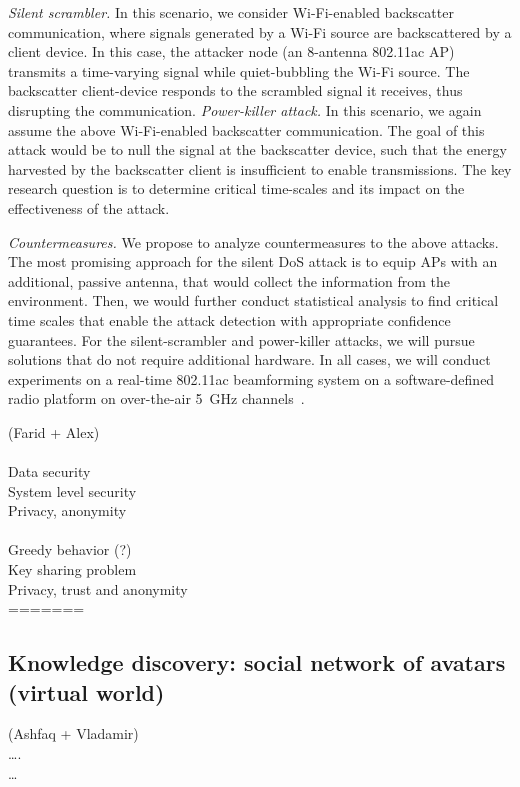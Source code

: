 \emph{Silent scrambler.} In this scenario, we consider Wi-Fi-enabled backscatter communication, where signals generated by a Wi-Fi source are backscattered by a client device. In this case, the attacker node (an 8-antenna 802.11ac AP) transmits a time-varying signal while quiet-bubbling the Wi-Fi source. The backscatter client-device responds to the scrambled signal it receives, thus disrupting the communication.
\emph{Power-killer attack.} In this scenario, we again assume the above Wi-Fi-enabled backscatter communication. The goal of this attack would be to null the signal at the backscatter device, such that the energy harvested by the backscatter client is insufficient to enable transmissions. The key research question is to determine critical time-scales and its impact on the effectiveness of the attack.

\emph{Countermeasures.} We propose to analyze countermeasures to the above attacks. The most promising approach for the silent DoS attack is to equip APs with an additional, passive antenna, that would collect the information from the environment. Then, we would further conduct statistical analysis to find critical time scales that enable the attack detection with appropriate confidence guarantees. For the silent-scrambler and power-killer attacks, we will pursue solutions that do not require additional hardware. In all cases, we will conduct experiments on a real-time 802.11ac beamforming system on a software-defined radio 
platform on over-the-air 5~GHz channels~\cite{warpProject}.



(Farid + Alex)\\
\\
Data security\\
System level security\\
Privacy, anonymity\\
\\
Greedy behavior (?)\\
Key sharing problem\\ 
Privacy, trust and anonymity \\

=======
\subsection{Knowledge discovery: social network of avatars (virtual world)}
(Ashfaq + Vladamir)\\
….\\
…\\

